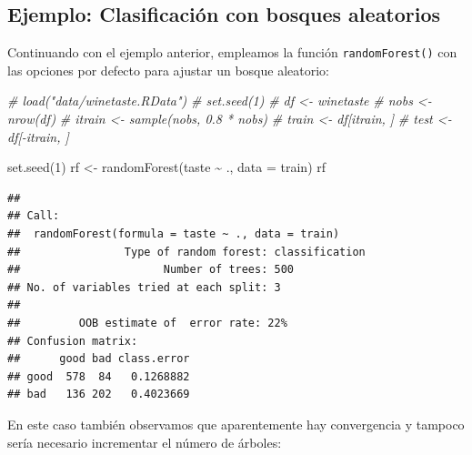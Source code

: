 \documentclass[
]{book}
\newenvironment{Shaded}{\begin{snugshade}}{\end{snugshade}}
\newcommand{\AttributeTok}[1]{\textcolor[rgb]{0.77,0.63,0.00}{#1}}
\newcommand{\CommentTok}[1]{\textcolor[rgb]{0.56,0.35,0.01}{\textit{#1}}}
\newcommand{\DecValTok}[1]{\textcolor[rgb]{0.00,0.00,0.81}{#1}}
\newcommand{\FunctionTok}[1]{\textcolor[rgb]{0.00,0.00,0.00}{#1}}
\newcommand{\NormalTok}[1]{#1}
\newcommand{\OtherTok}[1]{\textcolor[rgb]{0.56,0.35,0.01}{#1}}
\newcommand{\SpecialCharTok}[1]{\textcolor[rgb]{0.00,0.00,0.00}{#1}}
\newcommand{\StringTok}[1]{\textcolor[rgb]{0.31,0.60,0.02}{#1}}
\theoremstyle{break}
\theoremstyle{definition}
\theoremstyle{definition}
\theoremstyle{definition}
\theoremstyle{definition}
\theoremstyle{remark}
\begin{document}
\hypertarget{ejemplo-clasificaciuxf3n-con-bosques-aleatorios}{%
\subsection{Ejemplo: Clasificación con bosques aleatorios}\label{ejemplo-clasificaciuxf3n-con-bosques-aleatorios}}

Continuando con el ejemplo anterior, empleamos la función \texttt{randomForest()} con las opciones por defecto para ajustar un bosque aleatorio:

\begin{Shaded}
\begin{Highlighting}[]
\CommentTok{\# load("data/winetaste.RData")}
\CommentTok{\# set.seed(1)}
\CommentTok{\# df \textless{}{-} winetaste}
\CommentTok{\# nobs \textless{}{-} nrow(df)}
\CommentTok{\# itrain \textless{}{-} sample(nobs, 0.8 * nobs)}
\CommentTok{\# train \textless{}{-} df[itrain, ]}
\CommentTok{\# test \textless{}{-} df[{-}itrain, ]}

\FunctionTok{set.seed}\NormalTok{(}\DecValTok{1}\NormalTok{)}
\NormalTok{rf }\OtherTok{\textless{}{-}} \FunctionTok{randomForest}\NormalTok{(taste }\SpecialCharTok{\textasciitilde{}}\NormalTok{ ., }\AttributeTok{data =}\NormalTok{ train)}
\NormalTok{rf}
\end{Highlighting}
\end{Shaded}

\begin{verbatim}
## 
## Call:
##  randomForest(formula = taste ~ ., data = train) 
##                Type of random forest: classification
##                      Number of trees: 500
## No. of variables tried at each split: 3
## 
##         OOB estimate of  error rate: 22%
## Confusion matrix:
##      good bad class.error
## good  578  84   0.1268882
## bad   136 202   0.4023669
\end{verbatim}

En este caso también observamos que aparentemente hay convergencia y tampoco sería necesario incrementar el número de árboles:

\begin{Shaded}
\end{Shaded}
\end{document}
